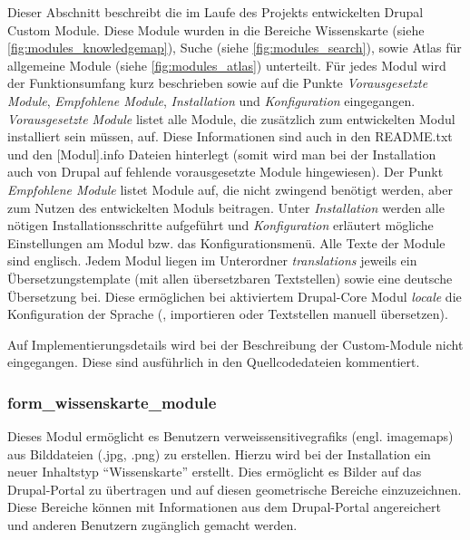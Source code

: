 Dieser Abschnitt beschreibt die im Laufe des Projekts entwickelten Drupal Custom Module. Diese Module wurden in die Bereiche Wissenskarte (siehe \cref{fig:modules_knowledgemap}), Suche (siehe \cref{fig:modules_search}), sowie Atlas für allgemeine Module (siehe \cref{fig:modules_atlas}) unterteilt.
Für jedes Modul wird der Funktionsumfang kurz beschrieben sowie auf die Punkte \textit{Vorausgesetzte Module}, \textit{Empfohlene Module}, \textit{Installation} und \textit{Konfiguration} eingegangen. \textit{Vorausgesetzte Module} listet alle Module, die zusätzlich zum entwickelten Modul installiert sein müssen, auf. Diese Informationen sind auch in den README.txt und den [Modul].info Dateien hinterlegt (somit wird man bei der Installation auch von Drupal auf fehlende vorausgesetzte Module hingewiesen). Der Punkt \textit{Empfohlene Module} listet Module auf, die nicht zwingend benötigt werden, aber zum Nutzen des entwickelten Moduls beitragen. Unter \textit{Installation} werden alle nötigen Installationsschritte aufgeführt und \textit{Konfiguration} erläutert mögliche Einstellungen am Modul bzw. das Konfigurationsmenü. Alle Texte der Module sind englisch. Jedem Modul liegen im Unterordner \textit{translations} jeweils ein Übersetzungstemplate (mit allen übersetzbaren Textstellen) sowie eine deutsche Übersetzung bei. Diese ermöglichen bei aktiviertem Drupal-Core Modul \textit{locale} die Konfiguration der Sprache (, importieren oder Textstellen manuell übersetzen).

Auf Implementierungsdetails wird bei der Beschreibung der Custom-Module nicht eingegangen. Diese sind ausführlich in den Quellcodedateien kommentiert.




\subsubsection{form\_wissenskarte\_module}\label{subsub:form_wissenskarte_module}
Dieses Modul ermöglicht es Benutzern \glspl{verweissensitivegrafik} (engl. \glspl{imagemap}) aus Bilddateien (.jpg, .png) zu erstellen. Hierzu wird bei der Installation ein neuer Inhaltstyp \enquote{Wissenskarte} erstellt. Dies ermöglicht es Bilder auf das Drupal-Portal zu übertragen und auf diesen geometrische Bereiche einzuzeichnen. Diese Bereiche können mit Informationen aus dem Drupal-Portal angereichert und anderen Benutzern zugänglich gemacht werden.

